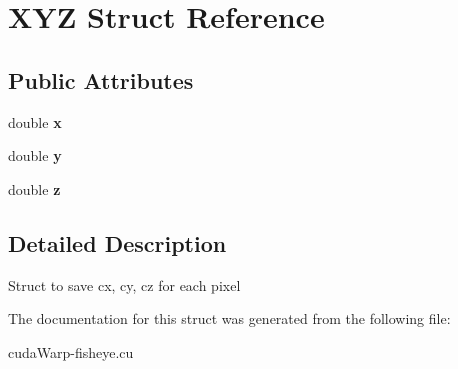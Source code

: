 \hypertarget{structXYZ}{}\section{X\+YZ Struct Reference}
\label{structXYZ}
\subsection*{Public Attributes}
\begin{DoxyCompactItemize}
\item 
double {\bfseries x}\hypertarget{structXYZ_a1f7f446eb3411e219da902419417c907}{}\label{structXYZ_a1f7f446eb3411e219da902419417c907}

\item 
double {\bfseries y}\hypertarget{structXYZ_ab3baa989a1b53304bc8a0b0a8d4afe61}{}\label{structXYZ_ab3baa989a1b53304bc8a0b0a8d4afe61}

\item 
double {\bfseries z}\hypertarget{structXYZ_a7a0a36dd9c757dcfde7559d66992d905}{}\label{structXYZ_a7a0a36dd9c757dcfde7559d66992d905}

\end{DoxyCompactItemize}


\subsection{Detailed Description}
Struct to save cx, cy, cz for each pixel 

The documentation for this struct was generated from the following file\+:\begin{DoxyCompactItemize}
\item 
cuda\+Warp-\/fisheye.\+cu\end{DoxyCompactItemize}
